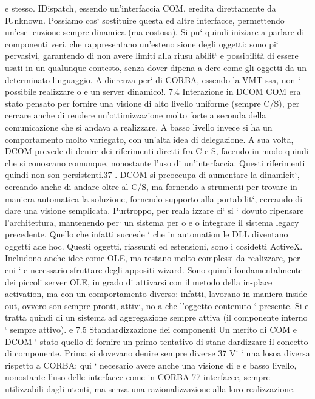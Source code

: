 \documentclass[a4paper,12pt]{article}
\begin{document}
e
stesso. IDispatch, essendo un'interfaccia COM, eredita direttamente da IUnknown. Possiamo cos` sostituire questa ed
altre interfacce, permettendo un'ese\i{}
cuzione sempre dinamica (ma costosa).
Si pu` quindi iniziare a parlare di componenti veri, che rappresentano un'esteno
sione degli oggetti: sono pi` pervasivi, garantendo di non avere limiti alla riusu
abilit` e possibilità di essere usati in un qualunque contesto, senza dover dipena
a
dere come gli oggetti da un determinato linguaggio.
A dierenza per` di CORBA, essendo la VMT ssa, non ` possibile realizzare
o
e
un server dinamico!.
7.4
Interazione in DCOM
COM era stato pensato per fornire una visione di alto livello uniforme (sempre
C/S), per cercare anche di rendere un'ottimizzazione molto forte a seconda
della comunicazione che si andava a realizzare. A basso livello invece si ha un
comportamento molto variegato, con un'alta idea di delegazione.
A sua volta, DCOM prevede di denire dei riferimenti diretti fra C e S,
facendo in modo quindi che si conoscano comunque, nonostante l'uso di un'interfaccia. Questi riferimenti quindi non son
persistenti.37 . DCOM si preoccupa
di aumentare la dinamicit`, cercando anche di andare oltre al C/S, ma fornendo
a
strumenti per trovare in maniera automatica la soluzione, fornendo supporto
alla portabilit`, cercando di dare una visione semplicata. Purtroppo, per reala
izzare ci` si ` dovuto ripensare l'architettura, mantenendo per` un sistema per
o e
o
integrare il sistema legacy precedente.
Quello che infatti succede ` che in automation le DLL diventano oggetti ade
hoc. Questi oggetti, riassunti ed estensioni, sono i cosidetti ActiveX. Includono
anche idee come OLE, ma restano molto complessi da realizzare, per cui `
e
necessario sfruttare degli appositi wizard. Sono quindi fondamentalmente dei
piccoli server OLE, in grado di attivarsi con il metodo della in-place activation,
ma con un comportamento diverso: infatti, lavorano in maniera inside out,
ovvero son sempre pronti, attivi, no a che l'oggetto contenuto ` presente. Si
e
tratta quindi di un sistema ad aggregazione sempre attiva (il componente interno
` sempre attivo).
e
7.5
Standardizzazione dei componenti
Un merito di COM e DCOM ` stato quello di fornire un primo tentativo di stane
dardizzare il concetto di componente. Prima si dovevano denire sempre diverse
37 Vi ` una losoa diversa rispetto a CORBA: qui ` necesario avere anche una visione di
e
e
basso livello, nonostante l'uso delle interfacce come in CORBA
77
interfacce, sempre utilizzabili dagli utenti, ma senza una razionalizzazione alla
loro realizzazione.
\end{document}
